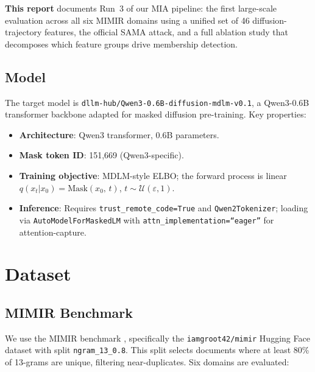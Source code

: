 \documentclass[11pt,a4paper]{article}
\begin{document}
\textbf{This report} documents Run~3 of our MIA pipeline: the first large-scale
evaluation across all six MIMIR domains using a unified set of 46 diffusion-
trajectory features, the official SAMA attack, and a full ablation study that
decomposes which feature groups drive membership detection.

\subsection{Model}
\label{sec:model}

The target model is \texttt{dllm-hub/Qwen3-0.6B-diffusion-mdlm-v0.1}, a
Qwen3-0.6B transformer backbone adapted for masked diffusion pre-training.
Key properties:
\begin{itemize}[nosep]
  \item \textbf{Architecture}: Qwen3 transformer, 0.6B parameters.
  \item \textbf{Mask token ID}: 151{,}669 (Qwen3-specific).
  \item \textbf{Training objective}: MDLM-style ELBO; the forward process is
        linear $q(x_t | x_0) = \text{Mask}(x_0,\, t)$, $t \sim \mathcal{U}(\varepsilon, 1)$.
  \item \textbf{Inference}: Requires \texttt{trust\_remote\_code=True} and
        \texttt{Qwen2Tokenizer}; loading via \texttt{AutoModelForMaskedLM} with
        \texttt{attn\_implementation=``eager''} for attention-capture.
\end{itemize}

\section{Dataset}

\subsection{MIMIR Benchmark}
\label{sec:mimir}

We use the MIMIR benchmark \citep{duan2024mimir}, specifically the
\texttt{iamgroot42/mimir} Hugging Face dataset with split
\texttt{ngram\_13\_0.8}.  This split selects documents where at least 80\% of
13-grams are unique, filtering near-duplicates. Six domains are evaluated:
\end{document}
